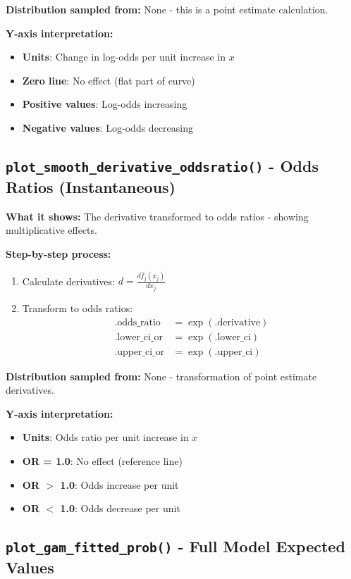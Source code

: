 \documentclass[11pt, a4paper]{article}
\begin{document}
\textbf{Distribution sampled from:} None - this is a point estimate calculation.

\textbf{Y-axis interpretation:}
\begin{itemize}
   \item \textbf{Units}: Change in log-odds per unit increase in $x$
   \item \textbf{Zero line}: No effect (flat part of curve)
   \item \textbf{Positive values}: Log-odds increasing
   \item \textbf{Negative values}: Log-odds decreasing
\end{itemize}

\subsection*{\texttt{plot\_smooth\_derivative\_oddsratio()} - Odds Ratios (Instantaneous)}

\textbf{What it shows:} The derivative transformed to odds ratios - showing multiplicative effects.

\textbf{Step-by-step process:}
\begin{enumerate}
   \item Calculate derivatives: $d = \frac{d\hat{f}_j(x_j)}{dx_j}$
   \item Transform to odds ratios:
   \begin{align}
   \text{.odds\_ratio} &= \exp(\text{.derivative}) \\
   \text{.lower\_ci\_or} &= \exp(\text{.lower\_ci}) \\
   \text{.upper\_ci\_or} &= \exp(\text{.upper\_ci})
   \end{align}
\end{enumerate}

\textbf{Distribution sampled from:} None - transformation of point estimate derivatives.

\textbf{Y-axis interpretation:}
\begin{itemize}
   \item \textbf{Units}: Odds ratio per unit increase in $x$
   \item \textbf{OR = 1.0}: No effect (reference line)
   \item \textbf{OR $>$ 1.0}: Odds increase per unit
   \item \textbf{OR $<$ 1.0}: Odds decrease per unit
\end{itemize}

\subsection*{\texttt{plot\_gam\_fitted\_prob()} - Full Model Expected Values}
\end{document}

